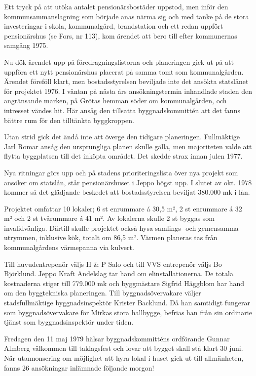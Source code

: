 Ett tryck på att utöka antalet pensionärsbostäder uppstod, men inför den kommunsammanslagning som började anas närma sig och med tanke på de stora investeringar i skola, kommunalgård, brandstation och ett redan uppfört pensionärshus (se Fors,  nr 113), kom ärendet att bero till efter kommunernas samgång 1975.

Nu dök ärendet upp på föredragningslistorna och planeringen gick ut på att uppföra ett nytt pensionärshus placerat på samma tomt som kommunalgården. Ärendet föreföll klart, men bostadsstyrelsen beviljade inte det ansökta statslånet för projektet 1976. I väntan på nästa års ansökningstermin inhandlade staden den angränsande
marken, på Grötas hemman söder om kommunalgården, och intresset vändes hit. Här ansåg den tillsatta byggnadskommittén att det fanns bättre rum för den tilltänkta byggkroppen.

Utan strid gick det ändå inte att överge den tidigare planeringen. Fullmäktige Jarl Romar ansåg den ursprungliga planen skulle gälla, men  majoriteten valde att flytta byggplatsen till det inköpta området. Det skedde strax innan julen 1977.

Nya ritningar görs upp och på stadens prioriteringslista över nya projekt som ansöker om statslån, står pensionärshuset i Jeppo högst upp. I slutet av okt. 1978 kommer så det glädjande beskedet att bostadsstyrelsen beviljat 380.000 mk i lån.

Projektet omfattar 10 lokaler;  6 st enrummare á 30,5 m², 2 st enrummare á 32 m² och 2 st tvårummare á 41 m². Av lokalerna skulle 2 st byggas som invalidvänliga. Därtill skulle projektet också hysa samlings- och gemensamma utrymmen, inklusive kök, totalt om 86,5 m². Värmen planeras tas från kommunalgårdens värmepanna via kulvert.

Till huvudentrepenör väljs H \& P Salo och till VVS entrepenör väljs Bo Björklund. Jeppo Kraft Andelslag tar hand om elinstallationerna. De totala kostnaderna stiger till 779.000 mk och byggmästare Sigfrid Häggblom har hand om den byggtekniska planeringen. Till byggnadsövervakare väljer stadsfullmäktige byggnadsinspektör Krister Backlund. Då han samtidigt fungerar som byggnadsövervakare för Mirkas stora hallbygge, befrias han från sin ordinarie tjänst som byggnadsinspektör under tiden.

Fredagen den 11 maj 1979 hälsar byggnadskommitténs ordförande Gunnar Almberg välkommen till taklagsfest och lovar att bygget skall stå klart 30 juni. När utannonsering om möjlighet att hyra lokal i huset gick ut till allmänheten, fanns 26 ansökningar inlämnade följande morgon!

